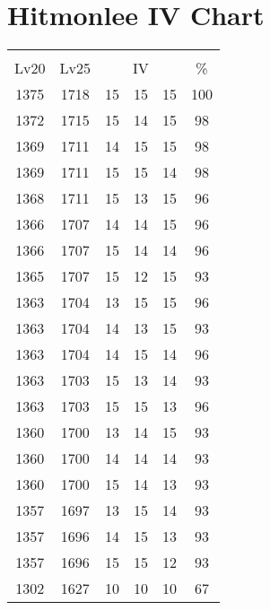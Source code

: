 \documentclass{article}%
\begin{document}
%
\normalsize%
\section{Hitmonlee IV Chart}%
\label{sec:Hitmonlee IV Chart}%
\renewcommand{\arraystretch}{1.5}%
\begin{tabular}{|c|c|c|c|c|c|}%
\hline%
\multicolumn{6}{|c|}{\textcolor{white}{ 
\linebreak{Hitmonlee}
}%
\cellcolor{black}}\\%
\multicolumn{1}{|c}{Lv20}&\multicolumn{1}{c|}{Lv25}&\multicolumn{3}{c|}{IV}&\multicolumn{1}{|c|}{\%}\\%
\hline%
\rowcolor{color100}%
1375&1718&15&15&15&100\\%
\hline%
\rowcolor{color98}%
1372&1715&15&14&15&98\\%
\hline%
\rowcolor{color98}%
1369&1711&14&15&15&98\\%
\hline%
\rowcolor{color98}%
1369&1711&15&15&14&98\\%
\hline%
\rowcolor{color96}%
1368&1711&15&13&15&96\\%
\hline%
\rowcolor{color96}%
1366&1707&14&14&15&96\\%
\hline%
\rowcolor{color96}%
1366&1707&15&14&14&96\\%
\hline%
\rowcolor{color93}%
1365&1707&15&12&15&93\\%
\hline%
\rowcolor{color96}%
1363&1704&13&15&15&96\\%
\hline%
\rowcolor{color93}%
1363&1704&14&13&15&93\\%
\hline%
\rowcolor{color96}%
1363&1704&14&15&14&96\\%
\hline%
\rowcolor{color93}%
1363&1703&15&13&14&93\\%
\hline%
\rowcolor{color96}%
1363&1703&15&15&13&96\\%
\hline%
\rowcolor{color93}%
1360&1700&13&14&15&93\\%
\hline%
\rowcolor{color93}%
1360&1700&14&14&14&93\\%
\hline%
\rowcolor{color93}%
1360&1700&15&14&13&93\\%
\hline%
\rowcolor{color93}%
1357&1697&13&15&14&93\\%
\hline%
\rowcolor{color93}%
1357&1696&14&15&13&93\\%
\hline%
\rowcolor{color93}%
1357&1696&15&15&12&93\\%
\hline%
\rowcolor{color91}%
1302&1627&10&10&10&67\\%
\end{tabular}

%
\end{document}
